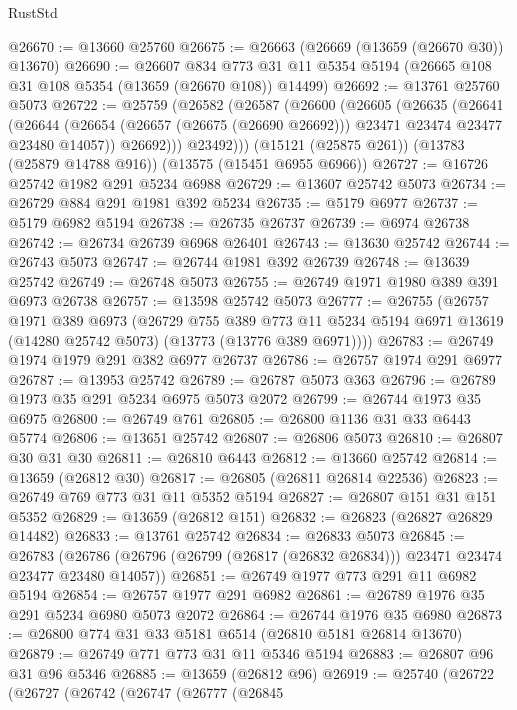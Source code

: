 \begin{lexlean}{RustStd}
\begin{coremodule}
@26670 := @13660 @25760
@26675 := @26663 (@26669 (@13659 (@26670 @30)) @13670)
@26690 := @26607
    @834
    @773
    @31
    @11
    @5354
    @5194
    (@26665 @108 @31 @108 @5354 (@13659 (@26670 @108)) @14499)
@26692 := @13761 @25760 @5073
@26722 := @25759
    (@26582
      (@26587
        (@26600
          (@26605
            (@26635
              (@26641
                (@26644
                  (@26654 (@26657 (@26675 (@26690 @26692))) @23471 @23474 @23477 @23480 @14057))
                @26692)))
          @23492)))
    (@15121 (@25875 @261))
    (@13783 (@25879 @14788 @916))
    (@13575 (@15451 @6955 @6966))
@26727 := @16726 @25742 @1982 @291 @5234 @6988
@26729 := @13607 @25742 @5073
@26734 := @26729 @884 @291 @1981 @392 @5234
@26735 := @5179 @6977
@26737 := @5179 @6982 @5194
@26738 := @26735 @26737
@26739 := @6974 @26738
@26742 := @26734 @26739 @6968 @26401
@26743 := @13630 @25742
@26744 := @26743 @5073
@26747 := @26744 @1981 @392 @26739
@26748 := @13639 @25742
@26749 := @26748 @5073
@26755 := @26749 @1971 @1980 @389 @391 @6973 @26738
@26757 := @13598 @25742 @5073
@26777 := @26755
    (@26757
      @1971
      @389
      @6973
      (@26729
        @755
        @389
        @773
        @11
        @5234
        @5194
        @6971
        @13619
        (@14280 @25742 @5073)
        (@13773 (@13776 @389 @6971))))
@26783 := @26749 @1974 @1979 @291 @382 @6977 @26737
@26786 := @26757 @1974 @291 @6977
@26787 := @13953 @25742
@26789 := @26787 @5073 @363
@26796 := @26789 @1973 @35 @291 @5234 @6975 @5073 @2072
@26799 := @26744 @1973 @35 @6975
@26800 := @26749 @761
@26805 := @26800 @1136 @31 @33 @6443 @5774
@26806 := @13651 @25742
@26807 := @26806 @5073
@26810 := @26807 @30 @31 @30
@26811 := @26810 @6443
@26812 := @13660 @25742
@26814 := @13659 (@26812 @30)
@26817 := @26805 (@26811 @26814 @22536)
@26823 := @26749 @769 @773 @31 @11 @5352 @5194
@26827 := @26807 @151 @31 @151 @5352
@26829 := @13659 (@26812 @151)
@26832 := @26823 (@26827 @26829 @14482)
@26833 := @13761 @25742
@26834 := @26833 @5073
@26845 := @26783
    (@26786 (@26796 (@26799 (@26817 (@26832 @26834))) @23471 @23474 @23477 @23480 @14057))
@26851 := @26749 @1977 @773 @291 @11 @6982 @5194
@26854 := @26757 @1977 @291 @6982
@26861 := @26789 @1976 @35 @291 @5234 @6980 @5073 @2072
@26864 := @26744 @1976 @35 @6980
@26873 := @26800 @774 @31 @33 @5181 @6514 (@26810 @5181 @26814 @13670)
@26879 := @26749 @771 @773 @31 @11 @5346 @5194
@26883 := @26807 @96 @31 @96 @5346
@26885 := @13659 (@26812 @96)
@26919 := @25740
    (@26722
      (@26727
        (@26742
          (@26747
            (@26777
              (@26845

\end{coremodule}
\end{lexlean}
